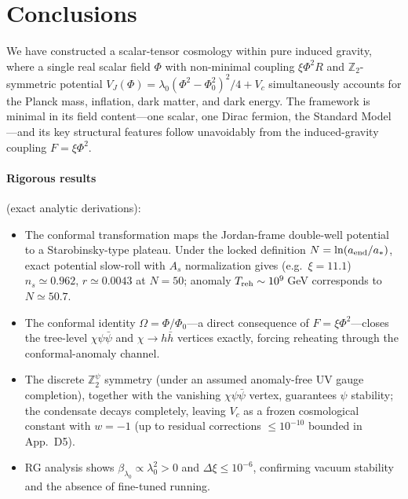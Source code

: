 \documentclass[pdflatex,sn-mathphys-num]{sn-jnl}
\newcommand{\Ztwo}{\mathbb{Z}_2}
\newcommand{\Ztwopsi}{\Ztwo^{\psi}}
\newcommand{\PhiV}{\Phi_0}
\theoremstyle{thmstyleone}
\begin{document}
\section{Conclusions}

We have constructed a scalar-tensor cosmology within pure induced gravity, where a single real scalar field $\Phi$ with non-minimal coupling $\xi\Phi^2R$ and $\Ztwo$-symmetric potential $V_J(\Phi)=\lambda_0(\Phi^2-\PhiV^2)^2/4+V_c$ simultaneously accounts for the Planck mass, inflation, dark matter, and dark energy. The framework is minimal in its field content---one scalar, one Dirac fermion, the Standard Model---and its key structural features follow unavoidably from the induced-gravity coupling $F=\xi\Phi^2$.

\paragraph{Rigorous results} (exact analytic derivations):
\begin{itemize}
\item The conformal transformation maps the Jordan-frame double-well potential to a Starobinsky-type plateau. Under the locked definition $N=\ln(a_{\rm end}/a_*)$, exact potential slow-roll with $A_s$ normalization gives (e.g.\ $\xi=11.1$) $n_s\simeq0.962$, $r\simeq0.0043$ at $N=50$; anomaly $T_{\rm reh}\sim10^9\,$GeV corresponds to $N\simeq50.7$.
\item The conformal identity $\Omega=\Phi/\PhiV$---a direct consequence of $F=\xi\Phi^2$---closes the tree-level $\chi\psi\bar\psi$ and $\chi\to h\bar h$ vertices exactly, forcing reheating through the conformal-anomaly channel.
\item The discrete $\Ztwopsi$ symmetry (under an assumed anomaly-free UV gauge completion), together with the vanishing $\chi\psi\bar\psi$ vertex, guarantees $\psi$ stability; the condensate decays completely, leaving $V_c$ as a frozen cosmological constant with $w=-1$ (up to residual corrections $\leq10^{-10}$ bounded in App.~D5).
\item RG analysis shows $\beta_{\lambda_0}\propto\lambda_0^2>0$ and $\Delta\xi\leq10^{-6}$, confirming vacuum stability and the absence of fine-tuned running.
\end{itemize}
\end{document}

